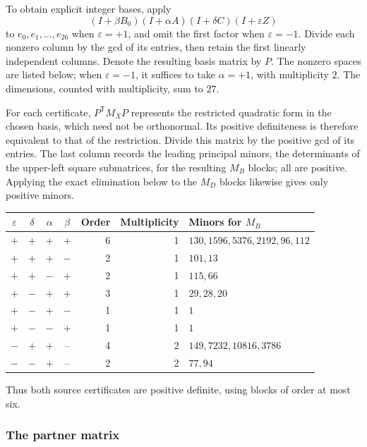 To obtain explicit integer bases, apply
\[
 (I+\beta B_0)(I+\alpha A)(I+\delta C)(I+\varepsilon Z)
\]
to $e_0,e_1,\ldots,e_{26}$ when $\varepsilon=+1$, and omit the first
factor when $\varepsilon=-1$. Divide each nonzero column by the gcd of its
entries, then retain the first linearly independent columns. Denote the
resulting basis matrix by $P$. The nonzero spaces are listed below;
when $\varepsilon=-1$, it suffices to take $\alpha=+1$, with multiplicity
$2$. The dimensions, counted with multiplicity, sum to $27$.

For each certificate, $P^{\mathsf T}M_XP$ represents the restricted
quadratic form in the chosen basis, which need not be orthonormal.
Its positive definiteness is therefore equivalent to that of the
restriction. Divide this matrix by the positive gcd of its entries.
The last column records the leading principal minors, the determinants
of the upper-left square submatrices, for the resulting $M_B$ blocks;
all are positive. Applying the exact
elimination below to the $M_D$ blocks likewise gives only positive minors.
\begin{center}
\small
\begin{tabular}{ccccrrl}
\toprule
$\varepsilon$&$\delta$&$\alpha$&$\beta$&Order&Multiplicity&Minors for $M_B$\\
\midrule
$+$&$+$&$+$&$+$&6&1&$130,1596,5376,2192,96,112$\\
$+$&$+$&$+$&$-$&2&1&$101,13$\\
$+$&$+$&$-$&$+$&2&1&$115,66$\\
$+$&$-$&$+$&$+$&3&1&$29,28,20$\\
$+$&$-$&$+$&$-$&1&1&$1$\\
$+$&$-$&$-$&$+$&1&1&$1$\\
$-$&$+$&$+$&--&4&2&$149,7232,10816,3786$\\
$-$&$-$&$+$&--&2&2&$77,94$\\
\bottomrule
\end{tabular}
\end{center}
Thus both source certificates are positive definite, using blocks of
order at most six.

\subsubsection{The partner matrix}


